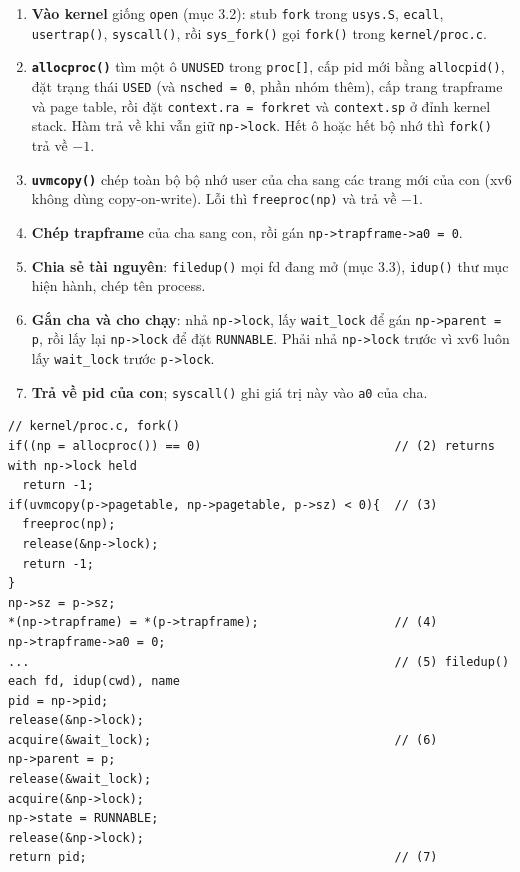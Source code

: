 \begin{enumerate}
    \item \textbf{Vào kernel} giống \texttt{open} (mục 3.2): stub \texttt{fork} trong \texttt{usys.S}, \texttt{ecall}, \texttt{usertrap()}, \texttt{syscall()}, rồi \texttt{sys\_fork()} gọi \texttt{fork()} trong \texttt{kernel/proc.c}.
    \item \textbf{\texttt{allocproc()}} tìm một ô \texttt{UNUSED} trong \texttt{proc[]}, cấp pid mới bằng \texttt{allocpid()}, đặt trạng thái \texttt{USED} (và \texttt{nsched = 0}, phần nhóm thêm), cấp trang trapframe và page table, rồi đặt \texttt{context.ra = forkret} và \texttt{context.sp} ở đỉnh kernel stack. Hàm trả về khi vẫn giữ \texttt{np->lock}. Hết ô hoặc hết bộ nhớ thì \texttt{fork()} trả về $-1$.
    \item \textbf{\texttt{uvmcopy()}} chép toàn bộ bộ nhớ user của cha sang các trang mới của con (xv6 không dùng copy-on-write). Lỗi thì \texttt{freeproc(np)} và trả về $-1$.
    \item \textbf{Chép trapframe} của cha sang con, rồi gán \texttt{np->trapframe->a0 = 0}.
    \item \textbf{Chia sẻ tài nguyên}: \texttt{filedup()} mọi fd đang mở (mục 3.3), \texttt{idup()} thư mục hiện hành, chép tên process.
    \item \textbf{Gắn cha và cho chạy}: nhả \texttt{np->lock}, lấy \texttt{wait\_lock} để gán \texttt{np->parent = p}, rồi lấy lại \texttt{np->lock} để đặt \texttt{RUNNABLE}. Phải nhả \texttt{np->lock} trước vì xv6 luôn lấy \texttt{wait\_lock} trước \texttt{p->lock}.
    \item \textbf{Trả về pid của con}; \texttt{syscall()} ghi giá trị này vào \texttt{a0} của cha.
\end{enumerate}

\begin{lstlisting}[style=xv6code]
// kernel/proc.c, fork()
if((np = allocproc()) == 0)                           // (2) returns with np->lock held
  return -1;
if(uvmcopy(p->pagetable, np->pagetable, p->sz) < 0){  // (3)
  freeproc(np);
  release(&np->lock);
  return -1;
}
np->sz = p->sz;
*(np->trapframe) = *(p->trapframe);                   // (4)
np->trapframe->a0 = 0;
...                                                   // (5) filedup() each fd, idup(cwd), name
pid = np->pid;
release(&np->lock);
acquire(&wait_lock);                                  // (6)
np->parent = p;
release(&wait_lock);
acquire(&np->lock);
np->state = RUNNABLE;
release(&np->lock);
return pid;                                           // (7)
\end{lstlisting}

